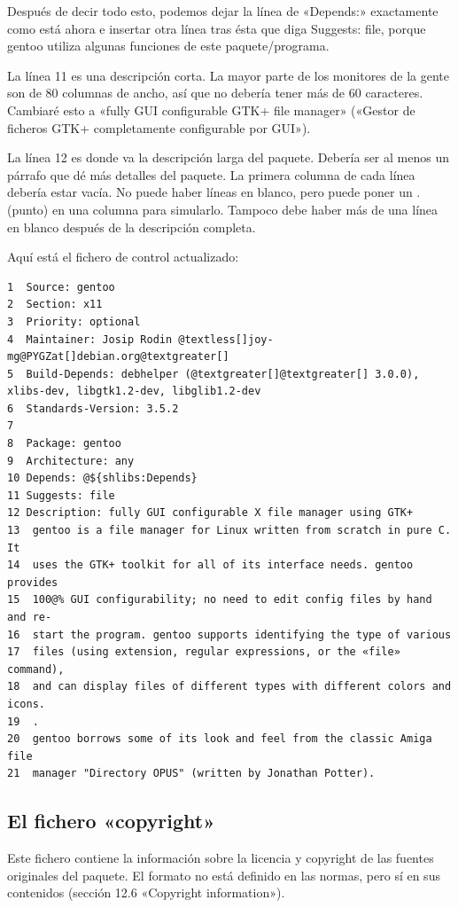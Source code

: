 \documentclass[letterpaper,12pt,spanish]{manual}
\begin{document}
Después de decir todo esto, podemos dejar la línea de «Depends:» exactamente como está ahora e insertar otra línea tras ésta que diga Suggests: file, porque gentoo utiliza algunas funciones de este paquete/programa.

La línea 11 es una descripción corta. La mayor parte de los monitores de la gente son de 80 columnas de ancho, así que no debería tener más de 60 caracteres. Cambiaré esto a «fully GUI configurable GTK+ file manager» («Gestor de ficheros GTK+ completamente configurable por GUI»).

La línea 12 es donde va la descripción larga del paquete. Debería ser al menos un párrafo que dé más detalles del paquete. La primera columna de cada línea debería estar vacía. No puede haber líneas en blanco, pero puede poner un . (punto) en una columna para simularlo. Tampoco debe haber más de una línea en blanco después de la descripción completa.

Aquí está el fichero de control actualizado:

\begin{Verbatim}[commandchars=@\[\]]
1  Source: gentoo
2  Section: x11
3  Priority: optional
4  Maintainer: Josip Rodin @textless[]joy-mg@PYGZat[]debian.org@textgreater[]
5  Build-Depends: debhelper (@textgreater[]@textgreater[] 3.0.0), xlibs-dev, libgtk1.2-dev, libglib1.2-dev
6  Standards-Version: 3.5.2
7
8  Package: gentoo
9  Architecture: any
10 Depends: @${shlibs:Depends}
11 Suggests: file
12 Description: fully GUI configurable X file manager using GTK+
13  gentoo is a file manager for Linux written from scratch in pure C. It
14  uses the GTK+ toolkit for all of its interface needs. gentoo provides
15  100@% GUI configurability; no need to edit config files by hand and re-
16  start the program. gentoo supports identifying the type of various
17  files (using extension, regular expressions, or the «file» command),
18  and can display files of different types with different colors and icons.
19  .
20  gentoo borrows some of its look and feel from the classic Amiga file
21  manager "Directory OPUS" (written by Jonathan Potter).
\end{Verbatim}


\subsection{El fichero «copyright»}

Este fichero contiene la información sobre la licencia y copyright de las fuentes originales del paquete. El formato no está definido en las normas, pero sí en sus contenidos (sección 12.6 «Copyright information»).
\end{document}
